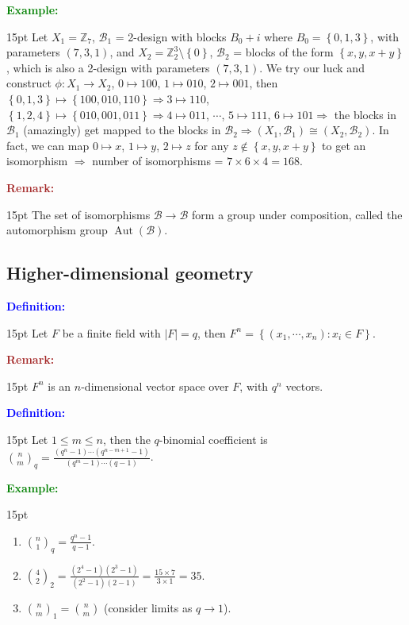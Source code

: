 \documentclass[12pt]{article}
\newcommand{\noparskip}{\vspace{-\parskip}}
\newenvironment{points}
	{\begin{enumerate}[label = (\arabic*)]}
	{\end{enumerate}}
\newenvironment{dent}
	{\begin{adjustwidth}{15pt}{}\noparskip}
	{\end{adjustwidth}}
\newenvironment{definition}
	{\textcolor{Blue}{\textbf{Definition:}}\begin{dent}}
	{\end{dent}}
\newenvironment{example}
	{\textcolor{Green}{\textbf{Example:}}\begin{dent}}
	{\end{dent}}
\newenvironment{remark}
	{\textcolor{Brown}{\textbf{Remark:}}\begin{dent}}
	{\end{dent}}
\renewcommand{\implies}{\Rightarrow}
\newcommand{\set}[1]{\left\{ #1 \right\}}
\newcommand{\sizeof}[1]{\left| #1 \right|}
\newcommand{\Z}{\mathbb{Z}}
\newcommand{\cB}{\mathcal{B}}
\newcommand{\aut}[1]{\operatorname{Aut}(#1)}
\begin{document}
\begin{example}
Let $X_1 = \Z_7$, $\cB_1$ = 2-design with blocks $B_0 + i$ where $B_0 = \set{0, 1, 3}$, with parameters $(7, 3, 1)$, and $X_2 = \Z_2^3 \setminus \set{0}$, $\cB_2$ = blocks of the form $\set{x, y, x + y}$, which is also a 2-design with parameters $(7, 3, 1)$. We try our luck and construct $\phi: X_1 \rightarrow X_2$, $0 \mapsto 100$, $1 \mapsto 010$, $2 \mapsto 001$, then $\set{0, 1, 3} \mapsto \set{100, 010, 110} \implies 3 \mapsto 110$, $\set{1, 2, 4} \mapsto \set{010, 001, 011} \implies 4 \mapsto 011$, $\cdots$, $5 \mapsto 111$, $6 \mapsto 101 \implies$ the blocks in $\cB_1$ (amazingly) get mapped to the blocks in $\cB_2 \implies (X_1, \cB_1) \cong (X_2, \cB_2)$. In fact, we can map $0 \mapsto x$, $1 \mapsto y$, $2 \mapsto z$ for any $z \notin \set{x, y, x + y}$ to get an isomorphism $\implies$ number of isomorphisms = $7 \times 6 \times 4 = 168$.
\end{example}

\begin{remark}
The set of isomorphisms $\cB \rightarrow \cB$ form a group under composition, called the automorphism group $\aut{\cB}$.
\end{remark}

\subsection{Higher-dimensional geometry}

\begin{definition}
Let $F$ be a finite field with $\sizeof{F} = q$, then $F^n = \set{(x_1, \cdots, x_n): x_i \in F}$.
\end{definition}

\begin{remark}
$F^n$ is an $n$-dimensional vector space over $F$, with $q^n$ vectors.
\end{remark}

\begin{definition}
Let $1 \le m \le n$, then the $q$-binomial coefficient is $\binom{n}{m}_q = \frac{(q^n - 1) \cdots (q^{n - m + 1} - 1)}{(q^m - 1) \cdots (q - 1)}$.
\end{definition}

\begin{example}
\begin{points}
\item $\binom{n}{1}_q = \frac{q^n - 1}{q - 1}$.
\item $\binom{4}{2}_2 = \frac{(2^4 - 1)(2^3 - 1)}{(2^2 - 1)(2 - 1)} = \frac{15 \times 7}{3 \times 1} = 35$.
\item $\binom{n}{m}_1 = \binom{n}{m}$ (consider limits as $q \rightarrow 1$).
\end{points}
\end{example}
\end{document}
